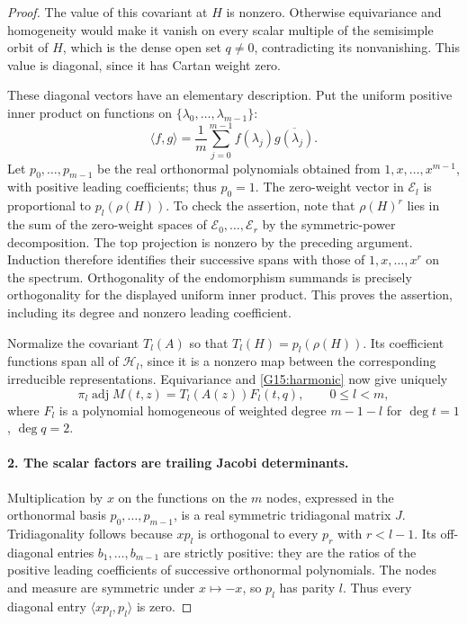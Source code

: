 \begin{proof}
The value of this covariant at $H$ is nonzero. Otherwise
equivariance and homogeneity would make it vanish on
every scalar multiple of the semisimple orbit of $H$,
which is the dense open set $q\ne0$, contradicting its
nonvanishing. This value is diagonal, since it has
Cartan weight zero.

These diagonal vectors have an elementary description.
Put the uniform positive inner product on functions on
$\{\lambda_0,\ldots,\lambda_{m-1}\}$:
\[
 \langle f,g\rangle=\frac1m\sum_{j=0}^{m-1}
                          f(\lambda_j)\overline{g(\lambda_j)}.
\]
Let $p_0,\ldots,p_{m-1}$ be the real orthonormal
polynomials obtained from $1,x,\ldots,x^{m-1}$, with
positive leading coefficients; thus $p_0=1$.
The zero-weight vector in $\mathcal E_l$ is proportional
to $p_l(\rho(H))$. To check the assertion, note that
$\rho(H)^r$ lies in the sum of the zero-weight spaces of
$\mathcal E_0,\ldots,\mathcal E_r$ by the symmetric-power
decomposition. The top projection is nonzero by the
preceding argument. Induction therefore identifies their
successive spans with those of $1,x,\ldots,x^r$ on the
spectrum. Orthogonality of the endomorphism summands
is precisely orthogonality for the displayed uniform
inner product. This proves the assertion, including
its degree and nonzero leading coefficient.

Normalize the covariant $T_l(A)$ so that
$T_l(H)=p_l(\rho(H))$. Its coefficient functions span
all of $\mathcal H_l$, since it is a nonzero map between
the corresponding irreducible representations.
Equivariance and \eqref{G15:harmonic} now give uniquely
\begin{equation}\label{G15:adjexpansion}
 \pi_l\operatorname{adj} M(t,z)=T_l(A(z))F_l(t,q),
 \qquad 0\leq l<m,
\end{equation}
where $F_l$ is a polynomial homogeneous of weighted
degree $m-1-l$ for $\deg t=1$, $\deg q=2$.

\paragraph{2. The scalar factors are trailing Jacobi determinants.}
Multiplication by $x$ on the functions on the $m$ nodes,
expressed in the orthonormal basis $p_0,\ldots,p_{m-1}$,
is a real symmetric tridiagonal matrix $J$.
Tridiagonality follows because $xp_l$ is orthogonal
to every $p_r$ with $r<l-1$. Its off-diagonal entries
$b_1,\ldots,b_{m-1}$ are strictly positive: they are
the ratios of the positive leading coefficients of
successive orthonormal polynomials. The nodes and
measure are symmetric under $x\mapsto-x$, so $p_l$
has parity $l$. Thus every diagonal entry
$\langle xp_l,p_l\rangle$ is zero.


\end{proof}
